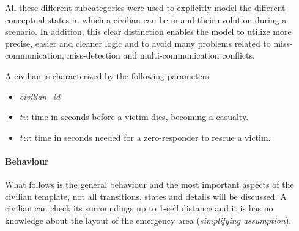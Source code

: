 \noindent
All these different subcategories were used to explicitly model the different conceptual states in which a civilian can be in and their evolution during a scenario. In addition, this clear distinction enables the model to utilize more precise, easier and cleaner logic and to avoid many problems related to miss-communication, miss-detection and multi-communication conflicts.\newline

\noindent
A civilian is characterized by the following parameters:
\begin{itemize}
	\item \textit{civilian\_id}
	\item \textit{tv}: time in seconds before a victim dies, becoming a casualty.
	\item \textit{tzr}: time in seconds needed for a zero-responder to rescue a victim.
\end{itemize}

\paragraph{Behaviour}
What follows is the general behaviour and the most important aspects of the civilian template, not all transitions, states and details will be discussed.\newline
A civilian can check its surroundings up to 1-cell distance and it is has no knowledge about the layout of the emergency area (\textit{simplifying assumption}).

